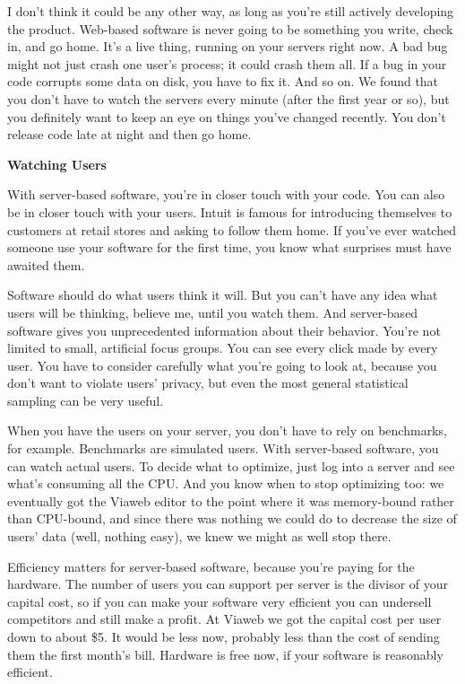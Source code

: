 \documentclass[12pt]{book}
\begin{document}
I don't think it could be any other way, as long as you're still
actively developing the product. Web-based software is never going to be
something you write, check in, and go home. It's a live thing, running
on your servers right now. A bad bug might not just crash one user's
process; it could crash them all. If a bug in your code corrupts some
data on disk, you have to fix it. And so on. We found that you don't
have to watch the servers every minute (after the first year or so), but
you definitely want to keep an eye on things you've changed recently.
You don't release code late at night and then go home.

\textbf{Watching Users}

With server-based software, you're in closer touch with your code. You
can also be in closer touch with your users. Intuit is famous for
introducing themselves to customers at retail stores and asking to
follow them home. If you've ever watched someone use your software for
the first time, you know what surprises must have awaited them.

Software should do what users think it will. But you can't have any idea
what users will be thinking, believe me, until you watch them. And
server-based software gives you unprecedented information about their
behavior. You're not limited to small, artificial focus groups. You can
see every click made by every user. You have to consider carefully what
you're going to look at, because you don't want to violate users'
privacy, but even the most general statistical sampling can be very
useful.

When you have the users on your server, you don't have to rely on
benchmarks, for example. Benchmarks are simulated users. With
server-based software, you can watch actual users. To decide what to
optimize, just log into a server and see what's consuming all the CPU.
And you know when to stop optimizing too: we eventually got the Viaweb
editor to the point where it was memory-bound rather than CPU-bound, and
since there was nothing we could do to decrease the size of users' data
(well, nothing easy), we knew we might as well stop there.

Efficiency matters for server-based software, because you're paying for
the hardware. The number of users you can support per server is the
divisor of your capital cost, so if you can make your software very
efficient you can undersell competitors and still make a profit. At
Viaweb we got the capital cost per user down to about \$5. It would be
less now, probably less than the cost of sending them the first month's
bill. Hardware is free now, if your software is reasonably efficient.
\end{document}
